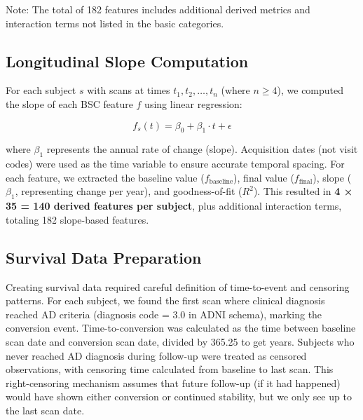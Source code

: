 \documentclass[blue]{ludusofficial}  %
\begin{document}
Note: The total of 182 features includes additional derived metrics and interaction terms not listed in the basic categories.

\subsection{Longitudinal Slope Computation}

For each subject $s$ with scans at times $t_1, t_2, \ldots, t_n$ (where $n \geq 4$), we computed the slope of each BSC feature $f$ using linear regression:

\begin{equation}
    f_s(t) = \beta_0 + \beta_1 \cdot t + \epsilon
\end{equation}

where $\beta_1$ represents the annual rate of change (slope). Acquisition dates (not visit codes) were used as the time variable to ensure accurate temporal spacing. For each feature, we extracted the baseline value ($f_{\text{baseline}}$), final value ($f_{\text{final}}$), slope ($\beta_1$, representing change per year), and goodness-of-fit ($R^2$). This resulted in \textbf{4 × 35 = 140 derived features per subject}, plus additional interaction terms, totaling 182 slope-based features.

\subsection{Survival Data Preparation}

Creating survival data required careful definition of time-to-event and censoring patterns. For each subject, we found the first scan where clinical diagnosis reached AD criteria (diagnosis code = 3.0 in ADNI schema), marking the conversion event. Time-to-conversion was calculated as the time between baseline scan date and conversion scan date, divided by 365.25 to get years. Subjects who never reached AD diagnosis during follow-up were treated as censored observations, with censoring time calculated from baseline to last scan. This right-censoring mechanism assumes that future follow-up (if it had happened) would have shown either conversion or continued stability, but we only see up to the last scan date.
\end{document}
